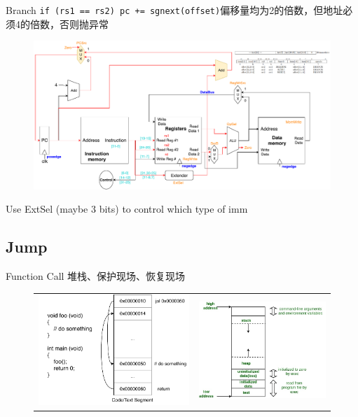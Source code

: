 \documentclass[UTF8]{ctexbeamer}
\newcommand{\fontsm}{\fontsize{8}{9.2}\selectfont}
\begin{document}
\begin{frame}[fragile]{Branch}
\fontsm \verb'if (rs1 == rs2) pc += sgnext(offset)'偏移量均为2的倍数，但地址必须4的倍数，否则抛异常
\begin{figure}
\centering
\includegraphics[width=\linewidth]{fig/Lecture2/Datapath-branch.pdf}
\end{figure}
Use ExtSel (maybe 3 bits) to control which type of imm
\end{frame}

\subsection{Jump}
\begin{frame}
\subsectionpage
\end{frame}

\begin{frame}{Function Call}
堆栈、保护现场、恢复现场
\begin{figure}
\centering
\begin{tabular}{cc}
\includegraphics[width=0.5\linewidth]{fig/Lecture2/Abstraction-Function_Call.pdf}&
\includegraphics[width=0.5\linewidth]{fig/Lecture2/memoryLayoutC.jpg}
\end{tabular}
\end{figure}
\end{frame}
\end{document}
